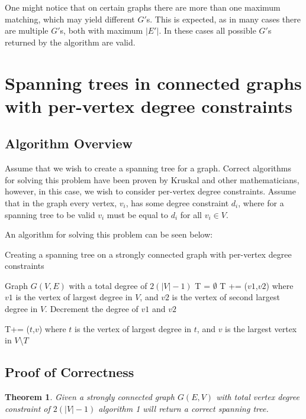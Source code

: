 \documentclass{article}
\begin{document}
	One might notice that on certain graphs there are more than one maximum matching, which may yield different $G'$s. This is expected, as in many cases there are multiple $G'$s, both with maximum $|E'|$. In these cases all possible $G'$s returned by the algorithm are valid.

	\newtheorem{theorem}{Theorem}
	\section{Spanning trees in connected graphs with per-vertex degree constraints}
	\subsection{Algorithm Overview}
	Assume that we wish to create a spanning tree for a graph. Correct algorithms for solving this problem have been proven by Kruskal and other
	mathematicians, however, in this case, we wish to consider per-vertex degree constraints. Assume that in the graph every vertex, $v_{i}$, has some degree constraint $d_{i}$,
	where for a spanning tree to be valid $v_{i}$ must be equal to $d_{i}$ for all $v_{i} \in V$.
	\newpage
	
	An algorithm for solving this problem can be seen below:
	\\

		\begin{algorithm}[H]
		\caption{Creating a spanning tree on a strongly connected graph with per-vertex degree constraints}
		\begin{algorithmic}[1]
			\State Graph $G(V,E)$ with a total degree of $2(|V|-1)$
			\State T = $\emptyset$
			\State T += ($v1$,$v2$) where $v1$ is the vertex of largest degree in $V$, and $v2$ is the vertex of second largest degree in $V$. Decrement the degree of $v1$ and $v2$
			\State \parbox[t]{\dimexpr\linewidth-\algorithmicindent}{T+= ($t$,$v$) where $t$ is the vertex of largest degree in $t$, and $v$ is the largest vertex in $V$\textbackslash$T$\strut}
			\EndWhile
		\end{algorithmic}
	\newpage
	\end{algorithm}
	\subsection{Proof of Correctness}
	\begin{theorem}
		Given a strongly connected graph $G(E,V)$ with total vertex degree constraint of $2(|V|-1)$ algorithm 1 will return a correct spanning tree.
	\end{theorem}
\end{document}
